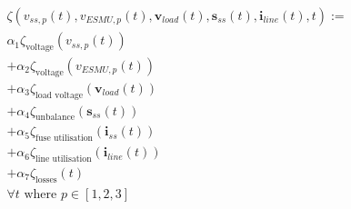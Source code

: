 

\begin{multline}
	\zeta(v_{ss,p}(t), v_{ESMU,p}(t), \textbf{v}_{load}(t), \textbf{s}_{ss}(t), \textbf{i}_{line}(t), t) :=\\
	\alpha_1 \zeta_\text{voltage}(v_{ss,p}(t))\\
	+ \alpha_2 \zeta_\text{voltage}(v_{ESMU,p}(t))\\
	+ \alpha_3 \zeta_\text{load voltage}(\textbf{v}_{load}(t))\\
	+ \alpha_4 \zeta_\text{unbalance}(\textbf{s}_{ss}(t))\\
	+ \alpha_5 \zeta_\text{fuse utilisation}(\textbf{i}_{ss}(t))\\
	+ \alpha_6 \zeta_\text{line utilisation}(\textbf{i}_{line}(t))\\
	+ \alpha_7 \zeta_\text{losses}(t)\\
	 \forall t \text{ where } p \in [1, 2, 3]
\label{ch1:equ:weighted-sum-cost-function}
\end{multline}